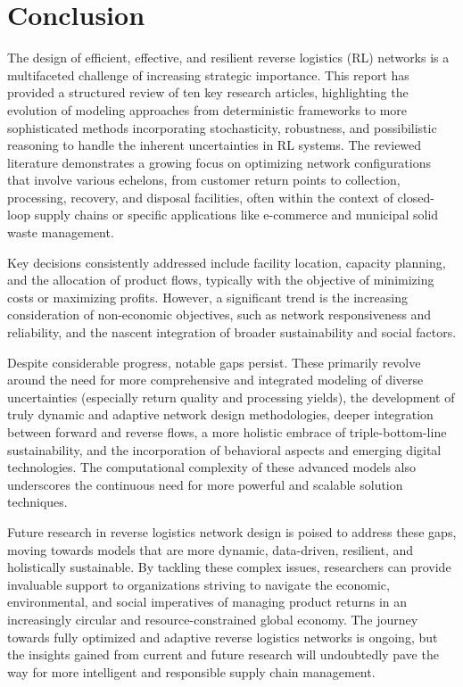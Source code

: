 \section{Conclusion}

The design of efficient, effective, and resilient reverse logistics (RL) networks is a multifaceted challenge of increasing strategic importance. This report has provided a structured review of ten key research articles, highlighting the evolution of modeling approaches from deterministic frameworks to more sophisticated methods incorporating stochasticity, robustness, and possibilistic reasoning to handle the inherent uncertainties in RL systems. The reviewed literature demonstrates a growing focus on optimizing network configurations that involve various echelons, from customer return points to collection, processing, recovery, and disposal facilities, often within the context of closed-loop supply chains or specific applications like e-commerce and municipal solid waste management.

Key decisions consistently addressed include facility location, capacity planning, and the allocation of product flows, typically with the objective of minimizing costs or maximizing profits. However, a significant trend is the increasing consideration of non-economic objectives, such as network responsiveness and reliability, and the nascent integration of broader sustainability and social factors.

Despite considerable progress, notable gaps persist. These primarily revolve around the need for more comprehensive and integrated modeling of diverse uncertainties (especially return quality and processing yields), the development of truly dynamic and adaptive network design methodologies, deeper integration between forward and reverse flows, a more holistic embrace of triple-bottom-line sustainability, and the incorporation of behavioral aspects and emerging digital technologies. The computational complexity of these advanced models also underscores the continuous need for more powerful and scalable solution techniques.

Future research in reverse logistics network design is poised to address these gaps, moving towards models that are more dynamic, data-driven, resilient, and holistically sustainable. By tackling these complex issues, researchers can provide invaluable support to organizations striving to navigate the economic, environmental, and social imperatives of managing product returns in an increasingly circular and resource-constrained global economy. The journey towards fully optimized and adaptive reverse logistics networks is ongoing, but the insights gained from current and future research will undoubtedly pave the way for more intelligent and responsible supply chain management.